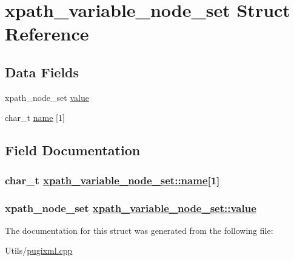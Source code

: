 \hypertarget{structxpath__variable__node__set}{
\section{xpath\_\-variable\_\-node\_\-set Struct Reference}
\label{structxpath__variable__node__set}
}
\subsection*{Data Fields}
\begin{CompactItemize}
\item 
xpath\_\-node\_\-set \hyperlink{structxpath__variable__node__set_830ac0dbcaf5f8ff3373d10273e72bf4}{value}
\item 
char\_\-t \hyperlink{structxpath__variable__node__set_9a6a40cea40764364adb3ddba2e7a2ff}{name} \mbox{[}1\mbox{]}
\end{CompactItemize}


\subsection{Field Documentation}
\hypertarget{structxpath__variable__node__set_9a6a40cea40764364adb3ddba2e7a2ff}{
\subsubsection[name]{\setlength{\rightskip}{0pt plus 5cm}char\_\-t \hyperlink{structxpath__variable__node__set_9a6a40cea40764364adb3ddba2e7a2ff}{xpath\_\-variable\_\-node\_\-set::name}\mbox{[}1\mbox{]}}}
\label{structxpath__variable__node__set_9a6a40cea40764364adb3ddba2e7a2ff}


\hypertarget{structxpath__variable__node__set_830ac0dbcaf5f8ff3373d10273e72bf4}{
\subsubsection[value]{\setlength{\rightskip}{0pt plus 5cm}xpath\_\-node\_\-set \hyperlink{structxpath__variable__node__set_830ac0dbcaf5f8ff3373d10273e72bf4}{xpath\_\-variable\_\-node\_\-set::value}}}
\label{structxpath__variable__node__set_830ac0dbcaf5f8ff3373d10273e72bf4}




The documentation for this struct was generated from the following file:\begin{CompactItemize}
\item 
Utils/\hyperlink{pugixml_8cpp}{pugixml.cpp}\end{CompactItemize}
